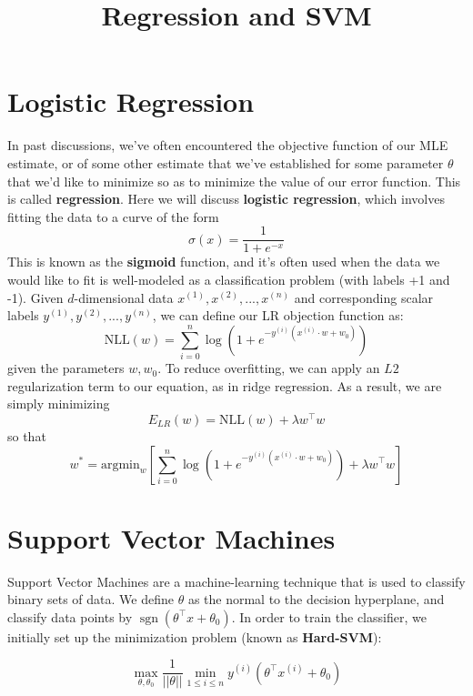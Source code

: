 \documentclass[10pt,letterpaper]{article}
\title{\vspace{-4ex}Regression and SVM\vspace{-3.5ex}}
\DeclareMathOperator{\sign}{sgn}
\begin{document}
\maketitle
\vspace{-0.5em}
\begin{abstract}

\end{abstract}

\section{Logistic Regression}
In past discussions, we've often encountered the objective function of our MLE estimate, or of some other estimate that we've established for some parameter $\theta$ that we'd like to minimize so as to minimize the value of our error function. This is called \textbf{regression}. Here we will discuss \textbf{logistic regression}, which involves fitting the data to a curve of the form
$$\sigma(x) = \frac{1}{1+e^{-x}}$$
This is known as the \textbf{sigmoid} function, and it's often used when the data we would like to fit is well-modeled as a classification problem (with labels +1 and -1). Given $d$-dimensional data $x^{(1)}, x^{(2)}, ... , x^{(n)}$ and corresponding scalar labels $y^{(1)}, y^{(2)}, ... , y^{(n)}$, we can define our LR objection function as:
$$\text{NLL}(w) = \sum_{i=0}^n\log(1+e^{-y^{(i)}(x^{(i)}\cdot w+w_0)})$$
given the parameters $w, w_0$. To reduce overfitting, we can apply an $L2$ regularization term to our equation, as in ridge regression. As a result, we are simply minimizing
$$E_{LR}(w) = \text{NLL}(w)+\lambda w^\intercal w$$
so that
$$w^* = \text{argmin}_w \left[\sum_{i=0}^n\log(1+e^{-y^{(i)}(x^{(i)}\cdot w+w_0)}) + \lambda w^\intercal w\right]$$
\section{Support Vector Machines}
Support Vector Machines are a machine-learning technique that is used to classify binary sets of data. We define $\theta$ as the normal to the decision hyperplane, and classify data points by $\sign (\theta^\intercal x + \theta_0)$. In order to train the classifier, we initially set up the minimization problem (known as \textbf{Hard-SVM}):

\begin{equation}
\max_{\theta, \theta_0} \dfrac{1}{||\theta||} \min_{1 \le i \le n} y^{(i)} (\theta^\intercal x^{(i)} + \theta_0)
\end{equation}
\end{document}
